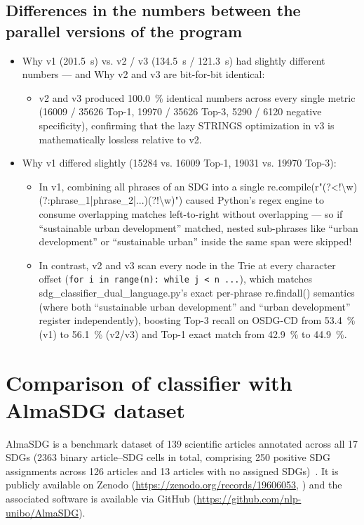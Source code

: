 \subsection{Differences in the numbers between the parallel versions of the program}
\begin{itemize}
    \item Why v1 (\qty{201.5}{\second}) vs. v2 / v3 (\qty{134.5}{\second} / \qty{121.3}{\second}) had slightly different numbers --- and Why v2 and v3 are bit-for-bit identical:
    \begin{itemize}
    \item v2 and v3 produced \qty{100.0}{\percent} identical numbers across every single metric (\num{16009} / \num{35626} Top-1, \num{19970} / \num{35626} Top-3, \num{5290} / \num{6120} negative specificity), confirming that the lazy STRINGS optimization in v3 is mathematically lossless relative to v2.
    \end{itemize}
    
    \item Why v1 differed slightly (\num{15284} vs. \num{16009} Top-1, \num{19031} vs. \num{19970} Top-3):
    \begin{itemize}
    \item In v1, combining all phrases of an \gls{SDG} into a single re.compile(r"(?<!\textbackslash w)(?:phrase\_1|phrase\_2|...)(?!\textbackslash w)") caused Python's regex engine to consume overlapping matches left-to-right without overlapping --- so if \enquote{sustainable urban development} matched, nested sub-phrases like \enquote{urban development} or \enquote{sustainable urban} inside the same span were skipped!

    \item In contrast, v2 and v3 scan every node in the Trie at every character offset (\texttt{for i in range(n): while j < n ...}), which matches sdg\_classifier\_dual\_language.py's exact per-phrase re.findall() semantics (where both \enquote{sustainable urban development} and \enquote{urban development} register independently), boosting Top-3 recall on OSDG-CD from \qty{53.4}{\percent} (v1) to \qty{56.1}{\percent} (v2/v3) and Top-1 exact match from \qty{42.9}{\percent} to \qty{44.9}{\percent}.
    \end{itemize}
\end{itemize}

\clearpage

\section{Comparison of classifier with AlmaSDG dataset}
\label{appendix:ComparisonWithAlmaSDG}
AlmaSDG is a benchmark dataset of \num{139} scientific articles annotated across all \num{17} \glspl{SDG} (\num{2363} binary article--\gls{SDG} cells in total, comprising \num{250} positive \gls{SDG} assignments across \num{126} articles and \num{13} articles with no assigned \glspl{SDG})~\cite{bolognini_almasdg_2026}. It is publicly available on Zenodo (\url{https://zenodo.org/records/19606053}, ) and the associated software is available via GitHub (\url{https://github.com/nlp-unibo/AlmaSDG}).

